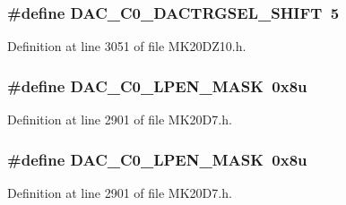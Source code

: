 \subsubsection[{\texorpdfstring{D\+A\+C\+\_\+\+C0\+\_\+\+D\+A\+C\+T\+R\+G\+S\+E\+L\+\_\+\+S\+H\+I\+FT}{DAC_C0_DACTRGSEL_SHIFT}}]{\setlength{\rightskip}{0pt plus 5cm}\#define D\+A\+C\+\_\+\+C0\+\_\+\+D\+A\+C\+T\+R\+G\+S\+E\+L\+\_\+\+S\+H\+I\+FT~5}\hypertarget{group___d_a_c___register___masks_ga32f43711fa193364231213bd67c989f4}{}\label{group___d_a_c___register___masks_ga32f43711fa193364231213bd67c989f4}


Definition at line 3051 of file M\+K20\+D\+Z10.\+h.

\subsubsection[{\texorpdfstring{D\+A\+C\+\_\+\+C0\+\_\+\+L\+P\+E\+N\+\_\+\+M\+A\+SK}{DAC_C0_LPEN_MASK}}]{\setlength{\rightskip}{0pt plus 5cm}\#define D\+A\+C\+\_\+\+C0\+\_\+\+L\+P\+E\+N\+\_\+\+M\+A\+SK~0x8u}\hypertarget{group___d_a_c___register___masks_ga54a04b9ae84c5a4f8977ae2e1a889717}{}\label{group___d_a_c___register___masks_ga54a04b9ae84c5a4f8977ae2e1a889717}


Definition at line 2901 of file M\+K20\+D7.\+h.

\subsubsection[{\texorpdfstring{D\+A\+C\+\_\+\+C0\+\_\+\+L\+P\+E\+N\+\_\+\+M\+A\+SK}{DAC_C0_LPEN_MASK}}]{\setlength{\rightskip}{0pt plus 5cm}\#define D\+A\+C\+\_\+\+C0\+\_\+\+L\+P\+E\+N\+\_\+\+M\+A\+SK~0x8u}\hypertarget{group___d_a_c___register___masks_ga54a04b9ae84c5a4f8977ae2e1a889717}{}\label{group___d_a_c___register___masks_ga54a04b9ae84c5a4f8977ae2e1a889717}


Definition at line 2901 of file M\+K20\+D7.\+h.

